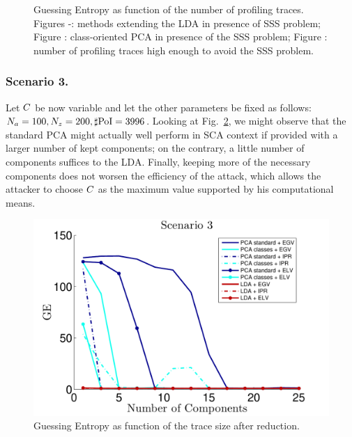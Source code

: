 \begin{figure}
\caption[Guessing Entropy as function of the number of profiling traces.]{Guessing Entropy as function of the number of profiling traces. Figures -: methods extending the LDA in presence of SSS problem; Figure : class-oriented PCA in presence of the SSS problem; Figure : number of profiling traces high enough to avoid the SSS problem.}\label{fig:scenario2}
\end{figure}


\subsubsection{Scenario 3.}
Let  $C$ be now variable and let the other parameters be fixed as follows: $N_a = 100, N_z=200, \sharp\mathrm{PoI} = 3996$. Looking at Fig.~\ref{fig:3}, we might observe that the standard PCA might actually well perform in SCA context if provided with a larger number of kept components; on the contrary, a little number of components suffices to the LDA. Finally, keeping more of the necessary components does not worsen the efficiency of the attack, which allows the attacker to choose $C$ as the maximum value supported by his computational means. 

\begin{figure}
\centering
\includegraphics[width=.5\textwidth]{../Figures/CARDIS2015/Criterion3.pdf}
\caption{Guessing Entropy as function of the trace size after reduction.}\label{fig:3}
\end{figure}

